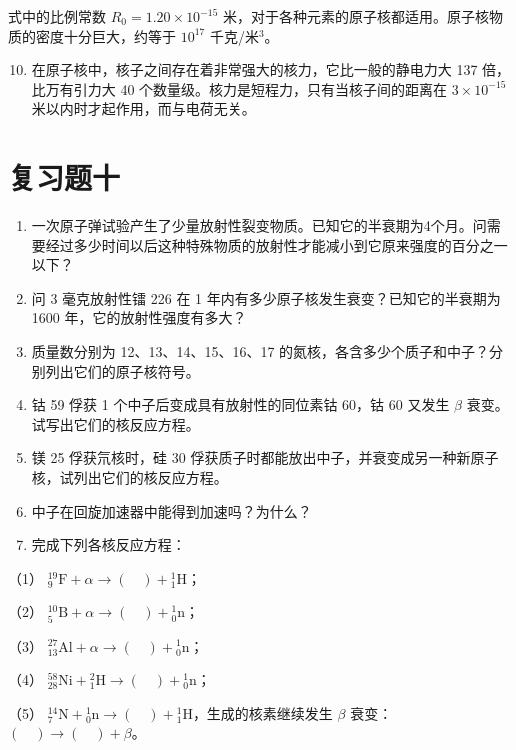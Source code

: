 式中的比例常数 \(R_{0} = 1.20 \times 10^{-15}\)
米，对于各种元素的原子核都适用。原子核物质的密度十分巨大，约等于
\(10^{17}\) 千克/米\(^{3}\)。

\begin{enumerate}
\setcounter{enumi}{9}
\item
  在原子核中，核子之间存在着非常强大的核力，它比一般的静电力大 137
  倍，比万有引力大 40 个数量级。核力是短程力，只有当核子间的距离在
  \(3 \times 10^{-15}\) 米以内时才起作用，而与电荷无关。
\end{enumerate}

\section{复习题十}

\begin{enumerate}
\item
  一次原子弹试验产生了少量放射性裂变物质。已知它的半衰期为4个月。问需要经过多少时间以后这种特殊物质的放射性才能减小到它原来强度的百分之一以下？
\item
  问 3 毫克放射性镭 226 在 1 年内有多少原子核发生衰变？已知它的半衰期为
  1600 年，它的放射性强度有多大？
\item
  质量数分别为 12、13、14、15、16、17
  的氮核，各含多少个质子和中子？分别列出它们的原子核符号。
\item
  钴 59 俘获 1 个中子后变成具有放射性的同位素钴 60，钴 60 又发生
  \(\beta\) 衰变。试写出它们的核反应方程。
\item
  镁 25 俘获氘核时，硅 30
  俘获质子时都能放出中子，并衰变成另一种新原子核，试列出它们的核反应方程。
\item
  中子在回旋加速器中能得到加速吗？为什么？
\item
  完成下列各核反应方程：
\end{enumerate}

（1）
\(^{19}_{9}\mathrm{F} + \alpha \longrightarrow (\quad) + {}^{1}_{1}\mathrm{H}\)；

（2）
\(^{10}_{5}\mathrm{B} + \alpha \longrightarrow (\quad) + {}^{1}_{0}\mathrm{n}\)；

（3）
\(^{27}_{13}\mathrm{Al} + \alpha \longrightarrow (\quad) + {}^{1}_{0}\mathrm{n}\)；

（4）
\(^{58}_{28}\mathrm{Ni} + {}^{2}_{1}\mathrm{H} \longrightarrow (\quad) + {}^{1}_{0}\mathrm{n}\)；

（5）
\(^{14}_{7}\mathrm{N} + {}^{1}_{0}\mathrm{n} \longrightarrow (\quad) + {}^{1}_{1}\mathrm{H}\)，生成的核素继续发生
\(\beta\) 衰变：\((\quad) \longrightarrow (\quad) + \beta\)。

